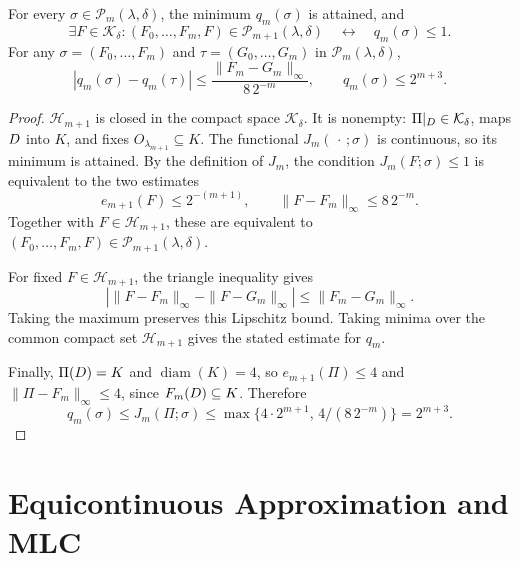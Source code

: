 \begin{proposition}
\label{prop:extension-minimum}
For every \(\sigma\in\mathcal P_m(\lambda,\delta)\), the minimum
\(q_m(\sigma)\) is attained, and
\[
 \exists F\in\mathcal K_\delta:
 (F_0,\ldots,F_m,F)\in\mathcal P_{m+1}(\lambda,\delta)
 \quad\leftrightarrow\quad q_m(\sigma)\le1.
\]
For any \(\sigma=(F_0,\ldots,F_m)\) and
\(\tau=(G_0,\ldots,G_m)\) in \(\mathcal P_m(\lambda,\delta)\),
\[
 |q_m(\sigma)-q_m(\tau)|
 \le\frac{\|F_m-G_m\|_\infty}{8\,2^{-m}},
 \qquad q_m(\sigma)\le2^{m+3}.
\]
\end{proposition}
\begin{proof}
\(\mathcal H_{m+1}\) is closed in the compact space
\(\mathcal K_\delta\). It is nonempty: \(\Pi|_{D}\in\mathcal K_\delta\),
maps \(D\) into \(K\), and fixes \(O_{\lambda_{m+1}}\subseteq K\).
The functional \(J_m(\,\cdot\,;\sigma)\) is continuous, so its minimum
is attained. By the definition of \(J_m\), the condition
\(J_m(F;\sigma)\le1\) is equivalent to the two estimates
\[
 e_{m+1}(F)\le2^{-(m+1)},\qquad
 \|F-F_m\|_\infty\le8\,2^{-m}.
\]
Together with \(F\in\mathcal H_{m+1}\), these are equivalent to
\((F_0,\ldots,F_m,F)\in\mathcal P_{m+1}(\lambda,\delta)\).

For fixed \(F\in\mathcal H_{m+1}\), the triangle inequality gives
\[
 \left|\|F-F_m\|_\infty-\|F-G_m\|_\infty\right|
 \le\|F_m-G_m\|_\infty.
\]
Taking the maximum preserves this Lipschitz bound. Taking minima over
the common compact set \(\mathcal H_{m+1}\) gives the stated estimate
for \(q_m\).

Finally, \(\Pi(D)=K\) and \(\operatorname{diam}(K)=4\), so
\(e_{m+1}(\Pi)\le4\) and \(\|\Pi-F_m\|_\infty\le4\), since
\(F_m(D)\subseteq K\). Therefore
\[
 q_m(\sigma)\le J_m(\Pi;\sigma)
 \le\max\{4\cdot2^{m+1},\,4/(8\,2^{-m})\}=2^{m+3}.
\]
\end{proof}

\section{Equicontinuous Approximation and MLC}

